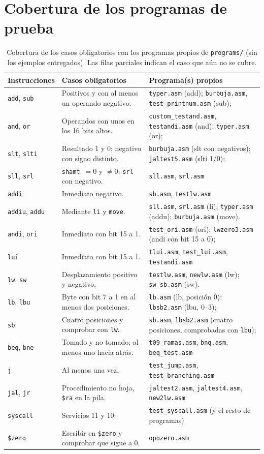 \documentclass[11pt,a4paper]{article}
\newcommand{\sig}[1]{\texttt{#1}}
\begin{document}
\section{Cobertura de los programas de prueba}
\begin{table}[H]
\centering
\footnotesize
\begin{tabular}{@{}p{1.95cm}p{6.0cm}p{7.85cm}@{}}
\toprule
Instrucciones & Casos obligatorios & Programa(s) propios \\
\midrule
\sig{add}, \sig{sub} & Positivos y con al menos un operando negativo. & \sig{typer.asm} (add); \sig{burbuja.asm}, \sig{test\_printnum.asm} (sub); \\
\sig{and}, \sig{or} & Operandos con unos en los 16 bits altos. & \sig{custom\_testand.asm}, \sig{testandi.asm} (and); \sig{typer.asm} (or); \\
\sig{slt}, \sig{slti} & Resultado 1 y 0; negativo con signo distinto. & \sig{burbuja.asm} (slt con negativos); \sig{jaltest5.asm} (slti 1/0); \\
\sig{sll}, \sig{srl} & \sig{shamt}~$=0$ y $\neq0$; \sig{srl} con negativo. & \sig{sll.asm}, \sig{srl.asm} \\
\sig{addi} & Inmediato negativo. & \sig{sb.asm}, \sig{testlw.asm} \\
\sig{addiu}, \sig{addu} & Mediante \sig{li} y \sig{move}. & \sig{sll.asm}, \sig{srl.asm} (li); \sig{typer.asm} (addu); \sig{burbuja.asm} (move). \\
\sig{andi}, \sig{ori} & Inmediato con bit 15 a 1. & \sig{test\_ori.asm} (ori); \sig{lwzero3.asm} (andi con bit 15 a 0); \\
\sig{lui} & Inmediato con bit 15 a 1. & \sig{tlui.asm}, \sig{test\_lui.asm}, \sig{testandi.asm} \\
\sig{lw}, \sig{sw} & Desplazamiento positivo y negativo. & \sig{testlw.asm}, \sig{newlw.asm} (lw); \sig{sw\_sb.asm} (sw). \\
\sig{lb}, \sig{lbu} & Byte con bit 7 a 1 en al menos dos posiciones. & \sig{lb.asm} (lb, posición 0); \sig{lbsb2.asm} (lbu, 0--3); \\
\sig{sb} & Cuatro posiciones y comprobar con \sig{lw}. & \sig{sb.asm}, \sig{lbsb2.asm} (cuatro posiciones, comprobadas con \sig{lbu}); \\
\sig{beq}, \sig{bne} & Tomado y no tomado; al menos uno hacia atrás. & \sig{t09\_ramas.asm}, \sig{bnq.asm}, \sig{beq\_test.asm} \\
\sig{j} & Al menos una vez. & \sig{test\_jump.asm}, \sig{test\_branching.asm} \\
\sig{jal}, \sig{jr} & Procedimiento no hoja, \sig{\$ra} en la pila. & \sig{jaltest2.asm}, \sig{jaltest4.asm}, \sig{new2lw.asm} \\
\sig{syscall} & Servicios 11 y 10. & \sig{test\_syscall.asm} (y el resto de programas) \\
\sig{\$zero} & Escribir en \sig{\$zero} y comprobar que sigue a 0. & \sig{opozero.asm} \\
\bottomrule
\end{tabular}
\caption{Cobertura de los casos obligatorios con los programas propios de \sig{programs/} (sin los ejemplos entregados). Las filas parciales indican el caso que aún no se cubre.}
\end{table}
\end{document}
